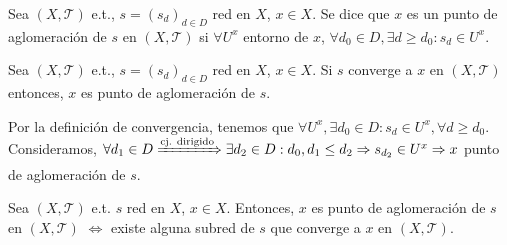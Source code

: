 \begin{defn}[Aglomeración]
  Sea $( X, \mathcal{T} )$ e.t., $s = (s_{d})_{d \in D}$ red en $X$, $x \in X$. Se dice que $x$ es un punto de aglomeración de $s$ en $( X, \mathcal{T} )$ si $\forall U^{x}$ entorno de $x$, $\forall d_{0} \in D, \exists d \geq d_{0}: s_{d} \in U^{x}$.
\end{defn}

\begin{prop}
  Sea $( X, \mathcal{T} )$ e.t., $s = (s_{d})_{d \in D}$ red en $X$, $x \in X$. Si $s$ converge a $x$ en $( X, \mathcal{T} )$ entonces, $x$ es punto de aglomeración de $s$.
\end{prop}

\begin{dem}
  Por la definición de convergencia, tenemos que $\forall U^{x}, \exists d_{0} \in D : s_{d} \in U^{x}, \forall d \geq d_{0}$. Consideramos, $\forall d_{1} \in D \xRightarrow[]{ \text{cj. dirigido} } \exists d_{2} \in D : d_{0}, d_{1} \leq d_{2} \Rightarrow s_{d_{2}} \in U^{x} \Rightarrow x$ punto de aglomeración de $s$.
\end{dem}

\begin{prop}
  Sea $( X, \mathcal{T} )$ e.t. $s$ red en $X$, $x \in X$. Entonces, $x$ es punto de aglomeración de $s$ en $( X, \mathcal{T} )$ $\Leftrightarrow$ existe alguna subred de $s$ que converge a $x$ en $( X, \mathcal{T} )$.
\end{prop}

